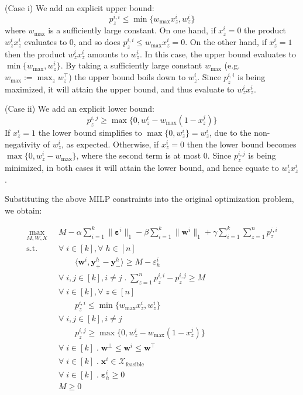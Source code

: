 \documentclass{article}
\renewcommand\[{\begin{equation}}
\renewcommand\]{\end{equation}}
\newcommand{\calvar}[1]{\ensuremath{\mathcal{#1}}}
\newcommand{\calX}{\calvar{X}}
\newcommand{\vecvar}[1]{\ensuremath{\boldsymbol{#1}}}
\newcommand{\vw}{\vecvar{w}}
\newcommand{\vx}{\vecvar{x}}
\newcommand{\vy}{\vecvar{y}}
\newcommand{\veps}{\vecvar{\varepsilon}}
\begin{document}
(Case i) We add an explicit upper bound:
%
$$ p^{i,i}_z \le \min \{ w_\text{max} x^{i}_z, w^{i}_z \} $$
%
where $w_\text{max}$ is a sufficiently large constant.
On one hand, if $x^i_z = 0$ the product $w^i_z x^i_z$ evaluates to $0$, and so does
$p^{i,i}_z \le w_\text{max} x^{i}_z = 0$. On the other hand, if $x^i_z=1$
then the product $w^i_z x^i_z$ amounts to $w^i_z$. In this case, the upper
bound evaluates to $\min \{ w_\text{max}, w^{i}_z \}$. By taking a sufficiently
large constant $w_\text{max}$ (e.g. $w_\text{max} := \max_z w^\top_z$) the upper bound
boils down to $w^i_z$. Since $p^{i,i}_z$ is being maximized, it will attain the
upper bound, and thus evaluate to $w^i_z x^i_z$.

(Case ii) We add an explicit lower bound:
%
$$ p^{i,j}_z \ge \max \{ 0, w^{i}_z - w_\text{max}(1 - x^{j}_z) \} $$
%
If $x^i_z = 1$ the lower bound simplifies to $\max \{ 0, w^{i}_z \} = w^{i}_z$,
due to the non-negativity of $w^i_z$, as expected. Otherwise, if $x^i_z = 0$
then the lower bound becomes $\max \{ 0, w^{i}_z - w_\text{max} \}$, where
the second term is at most $0$. Since $p^{i,j}_z$ is being minimized, in both
cases it will attain the lower bound, and hence equate to $w^i_z x^i_z$.

Substituting the above MILP constraints into the original optimization problem,
we obtain:
{\footnotesize
\begin{align}
    \max_{M, W, X}
        & \;\; M - \alpha \sum_{i=1}^k \| \veps^{i} \|_1 - \beta \sum_{i=1}^k \| \vw^{i} \|_1 + \gamma \sum_{i=1}^k \sum_{z=1}^n p^{i,i}_z
        \nonumber
    \\
    \text{s.t.}
        & \;\; \forall \; i \in [k], \forall \; h \in [n] \nonumber
    \\
        & \;\; \qquad \langle \vw^{i}, \vy^{h}_+ - \vy^{h}_- \rangle \ge M - \varepsilon^{i}_h \nonumber
    \\
        & \;\; \forall \; i, j \in [k], i \neq j \;.\; \sum_{z=1}^n p^{i,i}_z - p^{i,j}_z \ge M
    \\
        & \;\; \forall \; i \in [k], \forall \; z \in [n] \nonumber
    \\
        & \;\; \qquad p^{i,i}_z \le \min \{ w_\text{max} x^{i}_z, w^{i}_z \}
    \\
        & \;\; \forall \; i, j \in [k], i \neq j \nonumber
    \\
        & \;\; \qquad p^{i,j}_z \ge \max \{ 0, w^{i}_z - w_\text{max}(1 - x^{j}_z) \}
    \\
        & \;\; \forall \; i \in [k] \;.\; \vw^\bot \le \vw^{i} \le \vw^\top \nonumber
    \\
        & \;\; \forall \; i \in [k] \;.\; \vx^{i} \in \calX_{\text{feasible}} \nonumber
    \\
        & \;\; \forall \; i \in [k] \;.\; \veps^{i}_h \ge 0 \nonumber
    \\
        & \;\; M \ge 0 \nonumber
\end{align}

}
\end{document}
